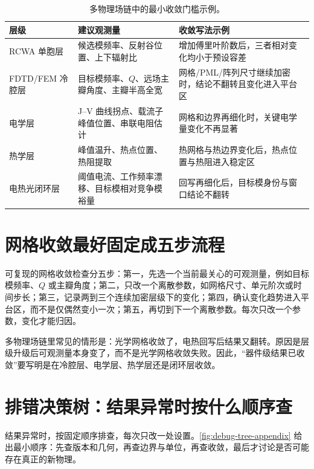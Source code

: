 \begin{table}[htbp]
  \centering
  \footnotesize
  \caption{多物理场链中的最小收敛门槛示例。}
  \label{tab:multiphysics_convergence}
  \begin{tabularx}{\textwidth}{@{}p{2.2cm}p{3.2cm}Y@{}}
    \toprule
    层级 & 建议观测量 & 收敛写法示例 \\ \midrule
    RCWA 单胞层 & 候选模频率、反射谷位置、上下辐射比 & 增加傅里叶阶数后，三者相对变化均小于预设容差 \\
    FDTD/FEM 冷腔层 & 目标模频率、$Q$、远场主瓣角度、主瓣半高全宽 & 网格/PML/阵列尺寸继续加密时，结论不翻转且变化进入平台区 \\
    电学层 & J--V 曲线拐点、载流子峰值位置、串联电阻估计 & 网格和边界再细化时，关键电学量变化不再显著 \\
    热学层 & 峰值温升、热点位置、热阻提取 & 热网格与热边界变化后，热点位置与热阻进入稳定区 \\
    电热光闭环层 & 阈值电流、工作频率漂移、目标模相对竞争模裕量 & 回写再细化后，目标模身份与窗口结论不翻转 \\
    \bottomrule
  \end{tabularx}
\end{table}

\section{网格收敛最好固定成五步流程}
可复现的网格收敛检查分五步：第一，先选一个当前最关心的可观测量，例如目标模频率、$Q$ 或主瓣角度；第二，只改一个离散参数，如网格尺寸、单元阶次或时间步长；第三，记录两到三个连续加密层级下的变化；第四，确认变化趋势进入平台区，而不是仅偶然变小一次；第五，再切到下一个离散参数。每次只改一个参数，变化才能归因。

\begin{PitfallBox}
多物理场链里常见的情形是：光学网格收敛了，电热回写后结果又翻转。原因是层级升级后可观测量本身变了，而不是光学网格收敛失败。因此，“器件级结果已收敛”要写明是在冷腔层、电学层、热学层还是闭环层收敛。
\end{PitfallBox}

\section{排错决策树：结果异常时按什么顺序查}
结果异常时，按固定顺序排查，每次只改一处设置。\cref{fig:debug-tree-appendix} 给出最小顺序：先查版本和几何，再查边界与单位，再查收敛，最后才讨论是否可能存在真正的新物理。

